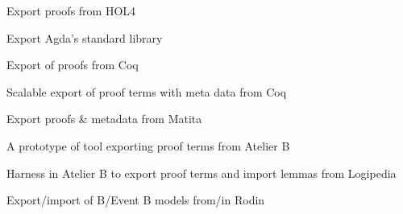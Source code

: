 \begin{workpackage}
\begin{wpdelivs}
  \begin{wpdeliv}[due=16,miles=hol4,id=hol4,dissem=PU,nature=OTHER,lead=Cha,task=HOL4]{Export proofs from HOL4}\end{wpdeliv}

  \begin{wpdeliv}[due=18,id=agda,dissem=PU,nature=OTHER,lead=Del,task=agda]{Export Agda's standard library}\end{wpdeliv}

  \begin{wpdeliv}[due=8,miles=coq,id=coq1,dissem=PU,nature=OTHER,lead=Inr,task=coq]{Export of proofs from Coq}\end{wpdeliv}

  \begin{wpdeliv}[due=24,id=coq2,dissem=PU,nature=OTHER,lead=Bol,task=coq]{Scalable export of proof terms with meta data from Coq}\end{wpdeliv}

  \begin{wpdeliv}[due=12,id=matita1,dissem=PU,nature=OTHER,lead=Bol,task=matita]{Export proofs \& metadata from Matita}\end{wpdeliv}

  \begin{wpdeliv}[due=24,id=atelier-b1,dissem=PU,nature=DEM,lead=Cle,task=atelier-b]{A prototype of tool exporting proof terms from Atelier B}\end{wpdeliv}

  \begin{wpdeliv}[due=48,id=atelier-b2,dissem=PU,nature=OTHER,lead=Cle,task=atelier-b]{Harness in Atelier B to export proof terms and import lemmas from Logipedia}\end{wpdeliv}

  \begin{wpdeliv}[due=48,id=atelier-b3,dissem=PU,nature=OTHER,lead=Tou,task=atelier-b]{Export/import of B/Event B models from/in Rodin}\end{wpdeliv}

\end{wpdelivs}

\end{workpackage}

